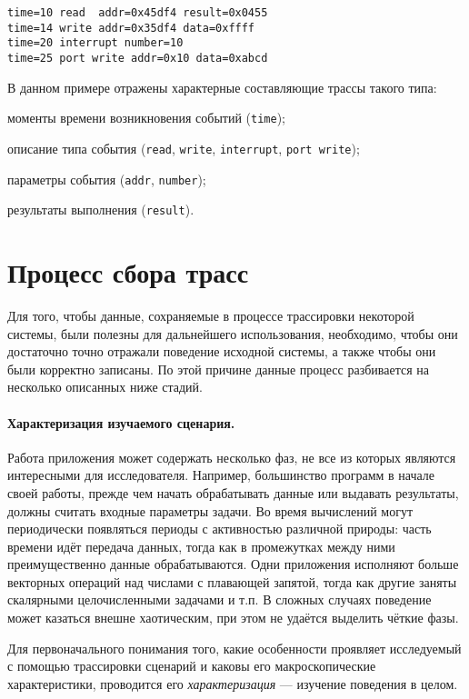\begin{lstlisting}
time=10 read  addr=0x45df4 result=0x0455
time=14 write addr=0x35df4 data=0xffff
time=20 interrupt number=10
time=25 port write addr=0x10 data=0xabcd
\end{lstlisting}

В данном примере отражены характерные составляющие трассы такого типа:
\begin{itemize*}
    \item моменты времени возникновения событий (\texttt{time});
    \item описание типа события (\texttt{read}, \texttt{write}, \texttt{interrupt}, \texttt{port write});
    \item параметры события (\texttt{addr}, \texttt{number});
    \item результаты выполнения (\texttt{result}).
\end{itemize*}

\section{Процесс сбора трасс}

Для того, чтобы данные, сохраняемые в процессе трассировки некоторой системы, были полезны для дальнейшего использования, необходимо, чтобы они достаточно точно отражали поведение исходной системы, а также чтобы они были корректно записаны. По этой причине данные процесс разбивается на несколько описанных ниже стадий.

\paragraph{Характеризация изучаемого сценария.} Работа приложения может содержать несколько фаз, не все из которых являются интересными для исследователя. Например, большинство программ в начале своей работы, прежде чем начать обрабатывать данные или выдавать результаты, должны считать входные параметры задачи. Во время вычислений могут периодически появляться периоды с активностью различной природы: часть времени идёт передача данных, тогда как в промежутках между ними преимущественно данные обрабатываются. Одни приложения исполняют больше векторных операций над числами с плавающей запятой, тогда как другие заняты скалярными целочисленными задачами и т.п. В сложных случаях поведение может казаться внешне хаотическим, при этом не удаётся выделить чёткие фазы.

Для первоначального понимания того, какие особенности проявляет исследуемый с помощью трассировки сценарий и каковы его макроскопические характеристики, проводится его \textit{характеризация} --- изучение поведения в целом.

